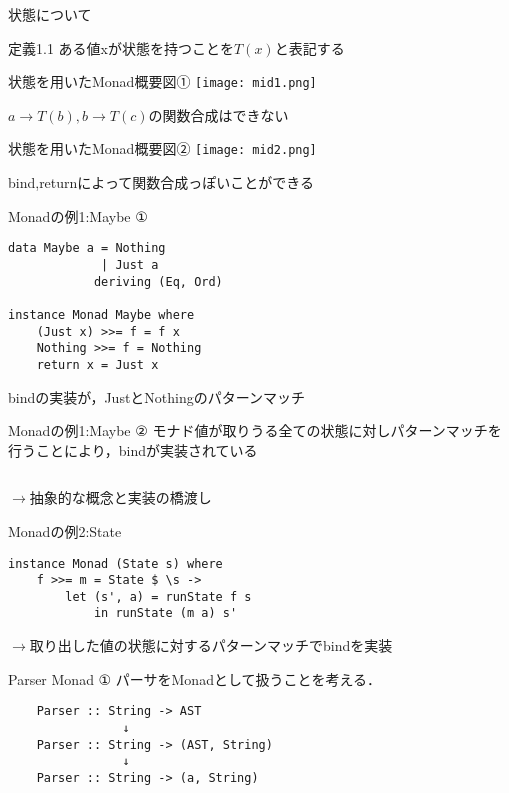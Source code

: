 \documentclass[uplatex,dvipdfmx,ja=standard]{beamer}
\begin{document}
\begin{frame}{状態について}
    \begin{block}{定義1.1}
    ある値xが状態を持つことを$T(x)$と表記する
    \end{block}
\end{frame}


\begin{frame}{状態を用いたMonad概要図①}
    \centering 
    \texttt{[image: mid1.png]}

    $a \to T(b) , b \to T(c)$の関数合成はできない
\end{frame}

\begin{frame}{状態を用いたMonad概要図②}
    \centering 
    \texttt{[image: mid2.png]}

    bind,returnによって関数合成っぽいことができる
\end{frame}

\begin{frame}[fragile]{Monadの例1:Maybe ①}
    \begin{verbatim}
data Maybe a = Nothing
             | Just a 
            deriving (Eq, Ord)
    
instance Monad Maybe where
    (Just x) >>= f = f x
    Nothing >>= f = Nothing
    return x = Just x
    \end{verbatim}
    bindの実装が，JustとNothingのパターンマッチ
\end{frame}

\begin{frame}[fragile]{Monadの例1:Maybe ②}
    モナド値が取りうる全ての状態に対しパターンマッチを行うことにより，bindが実装されている
    \begin{verbatim}

    \end{verbatim}
    $\to$抽象的な概念と実装の橋渡し
\end{frame}

\begin{frame}[fragile]{Monadの例2:State}
    \begin{verbatim}
instance Monad (State s) where
    f >>= m = State $ \s ->
        let (s', a) = runState f s
            in runState (m a) s'

    \end{verbatim}
    $\to$取り出した値の状態に対するパターンマッチでbindを実装
\end{frame}

\begin{frame}[fragile]{Parser Monad ①}
    パーサをMonadとして扱うことを考える．
    \begin{verbatim}
    Parser :: String -> AST
                ↓
    Parser :: String -> (AST, String)
                ↓
    Parser :: String -> (a, String)
    \end{verbatim}
\end{frame}
\end{document}
